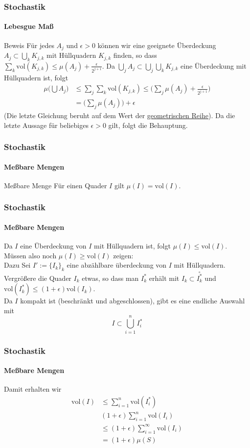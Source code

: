 \documentclass{beamer}
\begin{document}
\begin{frame}
    \frametitle{Stochastik}
\framesubtitle{Lebesgue Maß}
    \begin{block}{Beweis}
Für jedes $A_j$ und $\epsilon > 0$ können wir  eine geeignete Überdeckung  $A_j \subset \bigcup_k  K_{j,k}$ mit Hüllquadern $K_{j,k}$ finden, so dass 
 $\sum_k \text{vol} (K_{j,k}) \leq \mu(A_j) + \frac{\epsilon}{2^{j+1}}$.
Da $ \bigcup_j A_j \subset \bigcup_j \bigcup_k  K_{j,k}$ eine Überdeckung mit Hüllquadern ist, folgt
\begin{align*}
\mu \biggl (  \bigcup A_j  \biggr) & \leq \sum_j \sum_k \text{vol} (K_{j,k}) \leq  \bigl( \sum_j  \mu(A_j) + \frac{\epsilon}{2^{j+1}} \bigr)  \\
&= \bigl (\sum_j \mu(A_j) \bigr ) + \epsilon
\end{align*}
(Die letzte Gleichung beruht auf dem Wert der \href{https://de.wikipedia.org/wiki/Geometrische_Reihe}{geometrischen Reihe}).
Da die letzte Aussage für beliebiges $\epsilon > 0$ gilt, folgt die Behauptung.
\end{block}
 \end{frame}



\begin{frame}
    \frametitle{Stochastik}
\framesubtitle{Meßbare Mengen}
    \begin{block}{Meßbare Menge}
Für einen Quader $I$ gilt $\mu(I) =  \text{vol}(I) $.
\end{block}
 \end{frame}

 \begin{frame}
    \frametitle{Stochastik}
\framesubtitle{Meßbare Mengen}
Da $I$ eine Überdeckung von $I$ mit Hüllquadern ist, folgt $\mu(I) \leq \text{vol}(I)$.
\\ Müssen also noch $\mu(I) \geq \text{vol}(I)$ zeigen: \\
Dazu Sei $I' := \{ I_k \}_k$ eine abzählbare überdeckung von $I$ mit Hüllquadern.
Vergrößere die Quader $I_k$ etwas, so dass man $I_k^*$ erhält mit 
$I_k \subset \overset{\circ}{I_k^*}$ und $\text{vol}(I_k^*) \leq (1+ \epsilon)\text{vol}(I_k)$.
\\
Da $I$ kompakt ist (beschränkt und abgeschlossen), gibt es eine endliche Auswahl mit 
$$I \subset \bigcup_{i=1}^n I_i^*$$
\end{frame}


\begin{frame}
    \frametitle{Stochastik}
\framesubtitle{Meßbare Mengen}
Damit erhalten wir
\begin{align*}
    \text{vol}(I) & \leq \sum_{i=1}^n  \text{vol}(I_i^*) \\
& (1 + \epsilon) \sum_{i=1}^n  \text{vol}(I_i) \\
& \leq (1 + \epsilon) \sum_{i=1}^{\infty}  \text{vol}(I_i) \\
 & = (1 + \epsilon) \mu(S)
\end{align*}

\end{frame}
\end{document}
